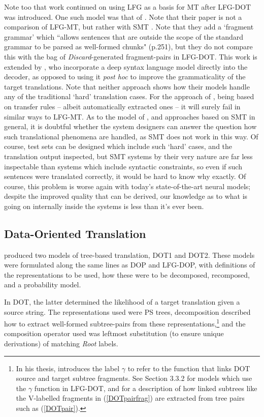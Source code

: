 \documentclass[output=paper,hidelinks]{langscibook}
\begin{document}
Note too that work continued on using LFG as a basis for MT after LFG-DOT was introduced. One such model was that of \citet{riezler-maxwell-iii-2006-grammatical}. Note that their paper is not a comparison of LFG-MT, but rather with SMT \citep{KOM2003}. Note that they add a `fragment grammar' which ``allows
sentences that are outside the scope of the standard grammar to be parsed as well-formed chunks" (p.251), but they do not compare this with the bag of {\em Discard}-generated fragment-pairs in LFG-DOT. This work is extended by \citet{grahamvangenabith12}, who incorporate a deep syntax language model directly into the decoder, as opposed to using it {\em post hoc} to improve the grammaticality of the target translations. Note that neither approach shows how their models handle any of the traditional `hard' translation cases. For the approach of \citet{riezler-maxwell-iii-2006-grammatical}, being based on transfer rules -- albeit automatically extracted ones -- it will surely fail in similar ways to LFG-MT. As to the model of \citet{grahamvangenabith12}, and approaches based on SMT in general, it is doubtful whether the system designers can answer the question how such translational phenomena are handled, as SMT does not work in this way. Of course, test sets can be designed which include such `hard' cases, and the translation output inspected, but SMT systems by their very nature are far less inspectable than systems which include syntactic constraints, so even if such sentences were translated correctly, it would be hard to know why exactly. Of course, this problem is worse again with today's state-of-the-art neural models; despite the improved quality that can be derived, our knowledge as to what is going on internally inside the systems is less than it's ever been.

\subsection{Data-Oriented Translation}
\label{sec:GrammarInduction:3.2}

\citet{DOT} produced two models of tree-based translation, DOT1 and DOT2. These models were formulated along the same lines as DOP and LFG-DOP, with definitions of the representations to be used, how these were to be decomposed, recomposed, and a probability model. 

In DOT, the latter determined the likelihood of a target translation given a source string. The representations used were PS trees, decomposition described how to extract well-formed subtree-pairs from these representations,\footnote{\label{fn:GrammarInduction:8}In his thesis, \cite{Way01} introduces the label $\gamma$ to refer to the function that links DOT source and target subtree fragments. See Section 3.3.2 for models which use the $\gamma$ function in LFG-DOT, and \cite[Sect. 2.1]{DOT} for a description of how linked subtrees like the V-labelled fragments in (\ref{DOTpairfrag}) are extracted from tree pairs such as (\ref{DOTpair}).}   and the composition operator used was leftmost substitution (to ensure unique derivations) of matching {\em Root} labels.
\end{document}
